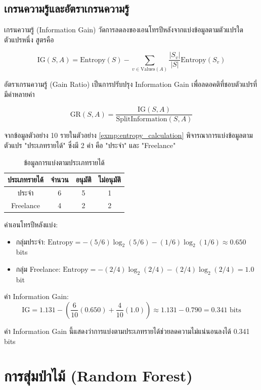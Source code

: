 \subsection{เกรนความรู้และอัตราเกรนความรู้}
เกรนความรู้ (Information Gain) วัดการลดลงของเอนโทรปีหลังจากแบ่งข้อมูลตามตัวแปรใดตัวแปรหนึ่ง สูตรคือ

\[
\text{IG}(S, A) = \text{Entropy}(S) - \sum_{v \in \text{Values}(A)} \frac{|S_v|}{|S|} \text{Entropy}(S_v)
\]

อัตราเกรนความรู้ (Gain Ratio) เป็นการปรับปรุง Information Gain เพื่อลดอคติที่ชอบตัวแปรที่มีค่าหลายค่า

\[
\text{GR}(S, A) = \frac{\text{IG}(S, A)}{\text{SplitInformation}(S, A)}
\]

\begin{exmp}
\label{exmp:information_gain}
จากข้อมูลตัวอย่าง 10 รายในตัวอย่าง \ref{exmp:entropy_calculation} พิจารณาการแบ่งข้อมูลตามตัวแปร "ประเภทรายได้" ซึ่งมี 2 ค่า คือ "ประจำ" และ "Freelance"

\begin{table}[h!]
\centering
\caption{ข้อมูลการแบ่งตามประเภทรายได้}
\label{tab:income_split}
\begin{tabular}{|c|c|c|c|}
\hline
\textbf{ประเภทรายได้} & \textbf{จำนวน} & \textbf{อนุมัติ} & \textbf{ไม่อนุมัติ} \\ \hline
ประจำ & 6 & 5 & 1 \\ \hline
Freelance & 4 & 2 & 2 \\ \hline
\end{tabular}
\end{table}

ค่าเอนโทรปีหลังแบ่ง:
\begin{itemize}
\item กลุ่มประจำ: $\text{Entropy} = -(5/6)\log_2(5/6) - (1/6)\log_2(1/6) \approx 0.650$ bits
\item กลุ่ม Freelance: $\text{Entropy} = -(2/4)\log_2(2/4) - (2/4)\log_2(2/4) = 1.0$ bit
\end{itemize}

ค่า Information Gain:
\[
\text{IG} = 1.131 - \left(\frac{6}{10}(0.650) + \frac{4}{10}(1.0)\right) \approx 1.131 - 0.790 = 0.341 \text{ bits}
\]

ค่า Information Gain นี้แสดงว่าการแบ่งตามประเภทรายได้ช่วยลดความไม่แน่นอนลงได้ 0.341 bits
\end{exmp}

\section{การสุ่มป่าไม้ (Random Forest)}
